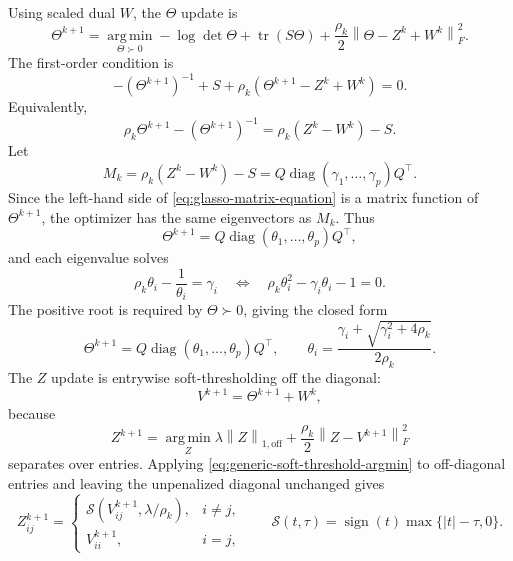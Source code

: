 \documentclass[11pt]{article}
\newcommand{\argmin}{\operatorname*{arg\,min}}
\newcommand{\tr}{\operatorname{tr}}
\newcommand{\diag}{\operatorname{diag}}
\newcommand{\shrink}{\mathcal{S}}
\newcommand{\norm}[1]{\left\lVert #1 \right\rVert}
\begin{document}
Using scaled dual $W$, the $\Theta$ update is
\begin{equation}
    \Theta^{k+1}
    =
    \argmin_{\Theta\succ0}
    -\log\det\Theta+\tr(S\Theta)
    +\frac{\rho_k}{2}
    \norm{\Theta-Z^k+W^k}_F^2 .
\end{equation}
The first-order condition is
\begin{equation}
    -(\Theta^{k+1})^{-1}+S+\rho_k(\Theta^{k+1}-Z^k+W^k)=0.
\end{equation}
Equivalently,
\begin{equation}
    \rho_k\Theta^{k+1}-(\Theta^{k+1})^{-1}
    =
    \rho_k(Z^k-W^k)-S.
    \label{eq:glasso-matrix-equation}
\end{equation}
Let
\begin{equation}
    M_k=\rho_k(Z^k-W^k)-S
    =
    Q\diag(\gamma_1,\ldots,\gamma_p)Q^\top .
\end{equation}
Since the left-hand side of \eqref{eq:glasso-matrix-equation} is a matrix
function of $\Theta^{k+1}$, the optimizer has the same eigenvectors as
$M_k$.  Thus
\begin{equation}
    \Theta^{k+1}=Q\diag(\theta_1,\ldots,\theta_p)Q^\top,
\end{equation}
and each eigenvalue solves
\begin{equation}
    \rho_k\theta_i-\frac{1}{\theta_i}=\gamma_i
    \quad \Longleftrightarrow \quad
    \rho_k\theta_i^2-\gamma_i\theta_i-1=0.
\end{equation}
The positive root is required by $\Theta\succ0$, giving the closed form
\begin{equation}
    \Theta^{k+1}
    =
    Q\diag(\theta_1,\ldots,\theta_p)Q^\top,
    \qquad
    \theta_i
    =
    \frac{\gamma_i+\sqrt{\gamma_i^2+4\rho_k}}{2\rho_k}.
    \label{eq:glasso-theta-update}
\end{equation}
The $Z$ update is entrywise soft-thresholding off the diagonal:
\begin{equation}
    V^{k+1}=\Theta^{k+1}+W^k,
\end{equation}
because
\begin{equation}
    Z^{k+1}
    =
    \argmin_Z
    \lambda\norm{Z}_{1,\mathrm{off}}
    +
    \frac{\rho_k}{2}\norm{Z-V^{k+1}}_F^2
\end{equation}
separates over entries.  Applying \eqref{eq:generic-soft-threshold-argmin}
to off-diagonal entries and leaving the unpenalized diagonal unchanged gives
\begin{equation}
    Z^{k+1}_{ij}
    =
    \begin{cases}
        \shrink(V^{k+1}_{ij},\lambda/\rho_k), & i\neq j,\\
        V^{k+1}_{ii}, & i=j,
    \end{cases}
    \qquad
    \shrink(t,\tau)=\operatorname{sign}(t)\max\{|t|-\tau,0\}.
\end{equation}
\end{document}
